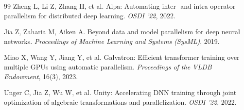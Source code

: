 \documentclass[11pt]{article}
\begin{document}
\begin{thebibliography}{99}
 Zheng L, Li Z, Zhang H, et al. Alpa: Automating inter- and intra-operator parallelism for distributed deep learning. \emph{OSDI '22}, 2022.

 Jia Z, Zaharia M, Aiken A. Beyond data and model parallelism for deep neural networks. \emph{Proceedings of Machine Learning and Systems (SysML)}, 2019.

 Miao X, Wang Y, Jiang Y, et al. Galvatron: Efficient transformer training over multiple GPUs using automatic parallelism. \emph{Proceedings of the VLDB Endowment}, 16(3), 2023.

 Unger C, Jia Z, Wu W, et al. Unity: Accelerating DNN training through joint optimization of algebraic transformations and parallelization. \emph{OSDI '22}, 2022.

\end{thebibliography}
\end{document}
